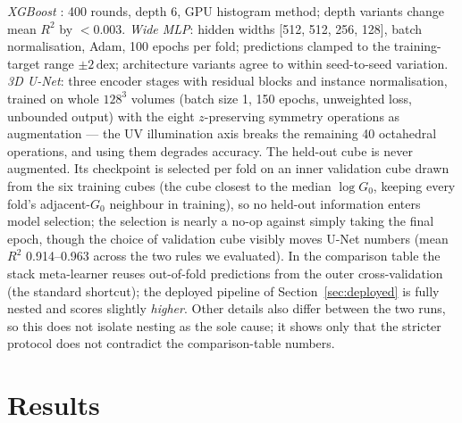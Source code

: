 \documentclass[fleqn,usenatbib]{rasti}
\newcommand{\Gzero}{G_0}
\newcommand{\dex}{\,\text{dex}}
\newcommand{\Rsq}{R^2}
\begin{document}
\emph{XGBoost} \citep{Chen2016}: 400 rounds, depth 6, GPU histogram
method; depth variants change mean \(\Rsq\) by \(<0.003\). \emph{Wide
MLP}: hidden widths [512, 512, 256, 128], batch normalisation, Adam,
100 epochs per fold; predictions clamped to the training-target range
\(\pm 2\dex\); architecture variants agree to within seed-to-seed
variation. \emph{3D U-Net}: three encoder stages with residual blocks
and instance normalisation, trained on whole \(128^3\) volumes (batch
size 1, 150 epochs, unweighted loss, unbounded output) with the eight
\(z\)-preserving symmetry operations as augmentation --- the UV
illumination axis breaks the remaining 40 octahedral operations, and
using them degrades accuracy. The held-out cube is never augmented. Its
checkpoint is selected per fold on an inner validation cube drawn from
the six training cubes (the cube closest to the median \(\log\Gzero\),
keeping every fold's adjacent-\(\Gzero\) neighbour in training), so no
held-out information enters model selection; the selection is nearly a
no-op against simply taking the final epoch, though the choice of
validation cube visibly moves U-Net numbers (mean \(\Rsq\) 0.914--0.963
across the two rules we evaluated). In the comparison table the stack
meta-learner reuses
out-of-fold predictions from the outer cross-validation (the standard
shortcut); the deployed pipeline of Section~\ref{sec:deployed} is fully
nested and scores slightly \emph{higher}. Other details also differ
between the two runs, so this does not isolate nesting as the sole
cause; it shows only that the stricter protocol does not contradict
the comparison-table numbers.

\section{Results}
\label{sec:results}
\end{document}
